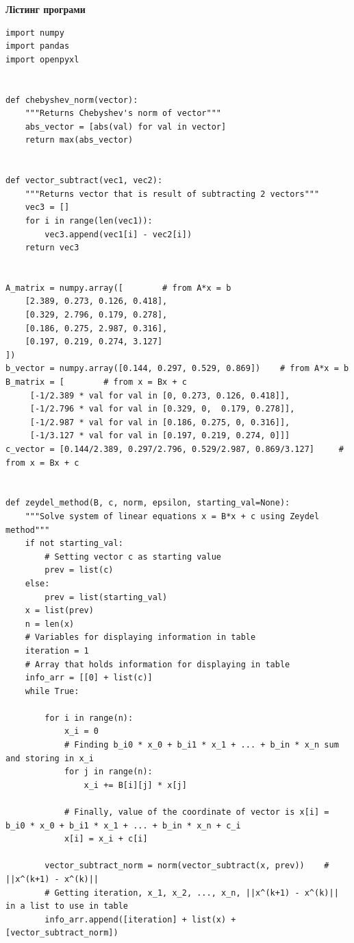 \documentclass[14 pt]{extarticle}
\begin{document}
\begin{center}
    \large
    \textbf{Лістинг програми}
\end{center}
\scriptsize
\begin{verbatim}
import numpy
import pandas
import openpyxl


def chebyshev_norm(vector):
    """Returns Chebyshev's norm of vector"""
    abs_vector = [abs(val) for val in vector]
    return max(abs_vector)


def vector_subtract(vec1, vec2):
    """Returns vector that is result of subtracting 2 vectors"""
    vec3 = []
    for i in range(len(vec1)):
        vec3.append(vec1[i] - vec2[i])
    return vec3


A_matrix = numpy.array([        # from A*x = b
    [2.389, 0.273, 0.126, 0.418],
    [0.329, 2.796, 0.179, 0.278],
    [0.186, 0.275, 2.987, 0.316],
    [0.197, 0.219, 0.274, 3.127]
])
b_vector = numpy.array([0.144, 0.297, 0.529, 0.869])    # from A*x = b
B_matrix = [        # from x = Bx + c
     [-1/2.389 * val for val in [0, 0.273, 0.126, 0.418]],
     [-1/2.796 * val for val in [0.329, 0,  0.179, 0.278]],
     [-1/2.987 * val for val in [0.186, 0.275, 0, 0.316]],
     [-1/3.127 * val for val in [0.197, 0.219, 0.274, 0]]]
c_vector = [0.144/2.389, 0.297/2.796, 0.529/2.987, 0.869/3.127]     # from x = Bx + c


def zeydel_method(B, c, norm, epsilon, starting_val=None):
    """Solve system of linear equations x = B*x + c using Zeydel method"""
    if not starting_val:
        # Setting vector c as starting value
        prev = list(c)
    else:
        prev = list(starting_val)
    x = list(prev)
    n = len(x)
    # Variables for displaying information in table
    iteration = 1
    # Array that holds information for displaying in table
    info_arr = [[0] + list(c)]
    while True:

        for i in range(n):
            x_i = 0
            # Finding b_i0 * x_0 + b_i1 * x_1 + ... + b_in * x_n sum and storing in x_i
            for j in range(n):
                x_i += B[i][j] * x[j]

            # Finally, value of the coordinate of vector is x[i] = b_i0 * x_0 + b_i1 * x_1 + ... + b_in * x_n + c_i
            x[i] = x_i + c[i]

        vector_subtract_norm = norm(vector_subtract(x, prev))    # ||x^(k+1) - x^(k)||
        # Getting iteration, x_1, x_2, ..., x_n, ||x^(k+1) - x^(k)|| in a list to use in table
        info_arr.append([iteration] + list(x) + [vector_subtract_norm])


\end{verbatim}
\end{document}
